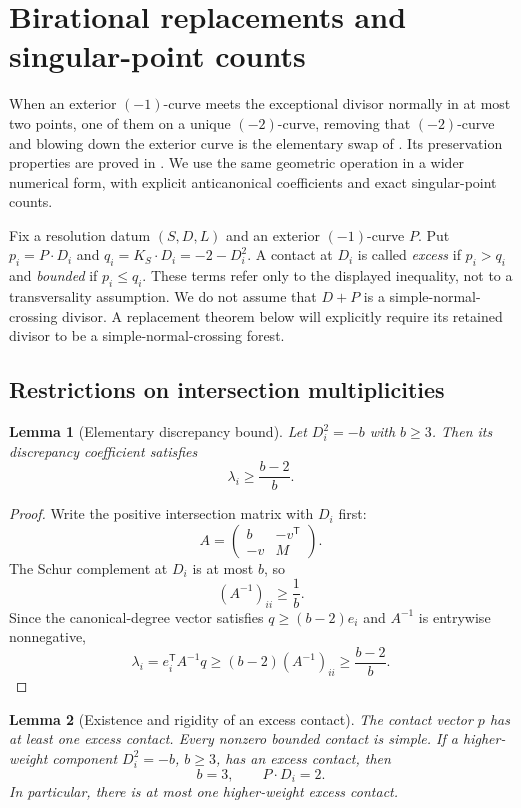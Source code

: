 \documentclass[11pt,reqno]{amsart}
\newtheorem{lemma}[lemma]{Lemma}
\theoremstyle{definition}
\theoremstyle{remark}
\numberwithin{equation}{section}
\begin{document}
\section{Birational replacements and singular-point counts}
\label{sec:replacements}
When an exterior $(-1)$-curve meets the exceptional divisor normally in
at most two points, one of them on a unique $(-2)$-curve, removing that
$(-2)$-curve and blowing down the exterior curve is the elementary swap
of \cite[Definition~1.3]{PalkaPelkaI}. Its preservation properties are
proved in \cite[Lemma~2.9]{PalkaPelkaI}. We use the same geometric
operation in a wider numerical form, with explicit anticanonical
coefficients and exact singular-point counts.

Fix a resolution datum $(S,D,L)$ and an exterior $(-1)$-curve $P$.
Put $p_i=P\cdot D_i$ and $q_i=K_S\cdot D_i=-2-D_i^2$.
A contact at $D_i$ is called \emph{excess} if $p_i>q_i$ and
\emph{bounded} if $p_i\le q_i$. These terms refer only to the displayed
inequality, not to a transversality assumption. We do not assume that
$D+P$ is a simple-normal-crossing divisor. A replacement theorem below
will explicitly require its retained divisor to be a
simple-normal-crossing forest.

\subsection{Restrictions on intersection multiplicities}
\begin{lemma}[Elementary discrepancy bound]\label{lem:elementary-discrepancy}
Let $D_i^2=-b$ with $b\ge3$.  Then its discrepancy coefficient satisfies
\[
  \lambda_i\ge \frac{b-2}{b}.
\]
\end{lemma}

\begin{proof}
Write the positive intersection matrix with $D_i$ first:
\[
  A=\begin{pmatrix}b&-v^{\mathsf T}\\-v&M\end{pmatrix}.
\]
The Schur complement at $D_i$ is at most $b$, so
\[
  (A^{-1})_{ii}\ge \frac1b.
\]
Since the canonical-degree vector satisfies $q\ge(b-2)e_i$ and $A^{-1}$ is entrywise nonnegative,
\[
  \lambda_i=e_i^{\mathsf T}A^{-1}q
  \ge(b-2)(A^{-1})_{ii}
  \ge\frac{b-2}{b}.
\]
\end{proof}

\begin{lemma}[Existence and rigidity of an excess contact]\label{lem:excess-contact}
The contact vector $p$ has at least one excess contact.  Every nonzero bounded contact is simple.  If a higher-weight component $D_i^2=-b$, $b\ge3$, has an excess contact, then
\[
  b=3,
  \qquad P\cdot D_i=2.
\]
In particular, there is at most one higher-weight excess contact.
\end{lemma}
\end{document}

